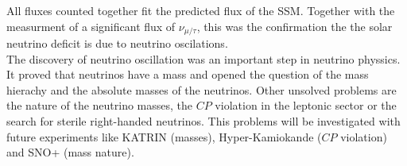 All fluxes counted together fit the predicted flux of the SSM. Together with the measurment of a significant flux of $\nu_{\mu/\tau}$, this was the confirmation the the solar neutrino deficit is due to neutrino oscilations.\\
The discovery of neutrino oscillation was an important step in neutrino physsics. It proved that neutrinos have a mass and opened the question of the mass hierachy and the absolute masses of the neutrinos. Other unsolved problems are the nature of the neutrino masses, the $CP$ violation in the leptonic sector or the search for sterile right-handed neutrinos. This problems will be investigated with future experiments like KATRIN (masses), Hyper-Kamiokande ($CP$ violation) and SNO+ (mass nature).
